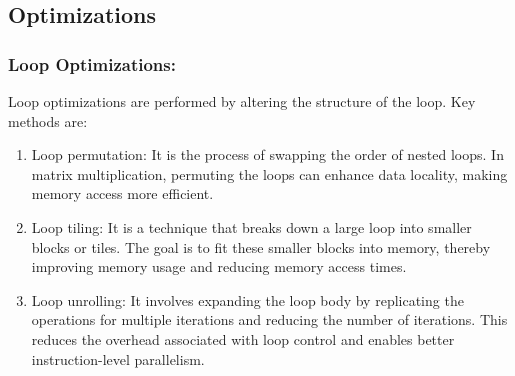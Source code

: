 \begin{table}[ht]
\caption{Table for DSE tool command-line arguments}
\centering
{}
\label{dseCommands}
\end{table}

\subsection{Optimizations}
\subsubsection{Loop Optimizations:}
Loop optimizations are performed by altering the structure of the loop. Key methods are:
\begin{enumerate}
    \item Loop permutation: It is the process of swapping the order of nested loops. In matrix multiplication, permuting the loops can enhance data locality, making memory access more efficient. 
    \item Loop tiling: It is a technique that breaks down a large loop into smaller blocks or tiles. The goal is to fit these smaller blocks into memory, thereby improving memory usage and reducing memory access times.
    \item Loop unrolling: It involves expanding the loop body by replicating the operations for multiple iterations and reducing the number of iterations. This reduces the overhead associated with loop control and enables better instruction-level parallelism.
\end{enumerate}

